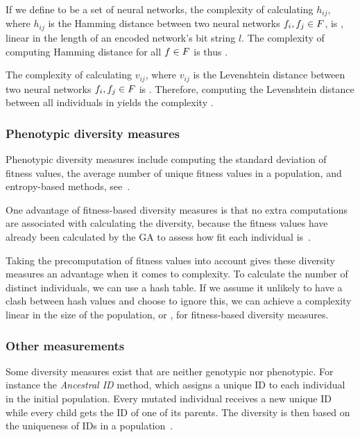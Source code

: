 If we define \indset{} to be a set of neural networks, the complexity of calculating $h_{ij}$, where $h_{ij}$ is the Hamming distance between two neural networks $f_i, f_j \in F$, is \bigO{\bitstringl}, linear in the length of an encoded network's bit string $l$. The complexity of computing Hamming distance for all $f \in F$ is thus \bigO{\indsetl^2 \cdot \bitstringl}. 

The complexity of calculating $v_{ij}$, where $v_{ij}$ is the Levenshtein distance between two neural networks $f_i, f_j \in F$ is \cite{Freeman:2006:CLN:1220835.1220895}. Therefore, computing the Levenshtein distance between all individuals in \indset{} yields the complexity .

\subsubsection{Phenotypic diversity measures}
Phenotypic diversity measures include computing the standard deviation of fitness values, the average number of unique fitness values in a population, and entropy-based methods, see~\cite{1250187, 1266373}.

One advantage of fitness-based diversity measures is that no extra computations are associated with calculating the diversity, because the fitness values have already been calculated by the GA to assess how fit each individual is~\cite{Nguyen:2006:ASPGP}.

Taking the precomputation of fitness values into account gives these diversity measures an advantage when it comes to complexity. To calculate the number of distinct individuals, we can use a hash table. If we assume it unlikely to have a clash between hash values and choose to ignore this, we can achieve a complexity linear in the size of the population, or \bigO{\indsetl}, for fitness-based diversity measures.

\subsubsection{Other measurements}
Some diversity measures exist that are neither genotypic nor phenotypic. For instance the \emph{Ancestral ID} method, which assigns a unique ID to each individual in the initial population. Every mutated individual receives a new unique ID while every child gets the ID of one of its parents. The diversity is then based on the uniqueness of IDs in a population~\cite{1250187}.
